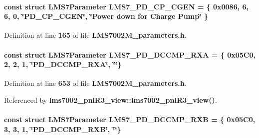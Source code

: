 \paragraph[{L\+M\+S7\+\_\+\+P\+D\+\_\+\+C\+P\+\_\+\+C\+G\+EN}]{\setlength{\rightskip}{0pt plus 5cm}const struct {\bf L\+M\+S7\+Parameter} L\+M\+S7\+\_\+\+P\+D\+\_\+\+C\+P\+\_\+\+C\+G\+EN = \{ 0x0086, 6, 6, 0, \char`\"{}\+P\+D\+\_\+\+C\+P\+\_\+\+C\+G\+E\+N\char`\"{}, \char`\"{}\+Power down for Charge Pump\char`\"{} \}\hspace{0.3cm}{\ttfamily [static]}}\label{LMS7002M__parameters_8h_a9129f7445a8a67a0cc68018e6229178c}


Definition at line {\bf 165} of file {\bf L\+M\+S7002\+M\+\_\+parameters.\+h}.

\paragraph[{L\+M\+S7\+\_\+\+P\+D\+\_\+\+D\+C\+C\+M\+P\+\_\+\+R\+XA}]{\setlength{\rightskip}{0pt plus 5cm}const struct {\bf L\+M\+S7\+Parameter} L\+M\+S7\+\_\+\+P\+D\+\_\+\+D\+C\+C\+M\+P\+\_\+\+R\+XA = \{ 0x05\+C0, 2, 2, 1, \char`\"{}\+P\+D\+\_\+\+D\+C\+C\+M\+P\+\_\+\+R\+X\+A\char`\"{}, \char`\"{}\char`\"{}\}\hspace{0.3cm}{\ttfamily [static]}}\label{LMS7002M__parameters_8h_ae6f034aa7f19f96a68468e684665a57a}


Definition at line {\bf 653} of file {\bf L\+M\+S7002\+M\+\_\+parameters.\+h}.



Referenced by {\bf lms7002\+\_\+pnl\+R3\+\_\+view\+::lms7002\+\_\+pnl\+R3\+\_\+view()}.

\paragraph[{L\+M\+S7\+\_\+\+P\+D\+\_\+\+D\+C\+C\+M\+P\+\_\+\+R\+XB}]{\setlength{\rightskip}{0pt plus 5cm}const struct {\bf L\+M\+S7\+Parameter} L\+M\+S7\+\_\+\+P\+D\+\_\+\+D\+C\+C\+M\+P\+\_\+\+R\+XB = \{ 0x05\+C0, 3, 3, 1, \char`\"{}\+P\+D\+\_\+\+D\+C\+C\+M\+P\+\_\+\+R\+X\+B\char`\"{}, \char`\"{}\char`\"{}\}\hspace{0.3cm}{\ttfamily [static]}}\label{LMS7002M__parameters_8h_af10cfd49232b74d0f00c81cbacf614fd}


